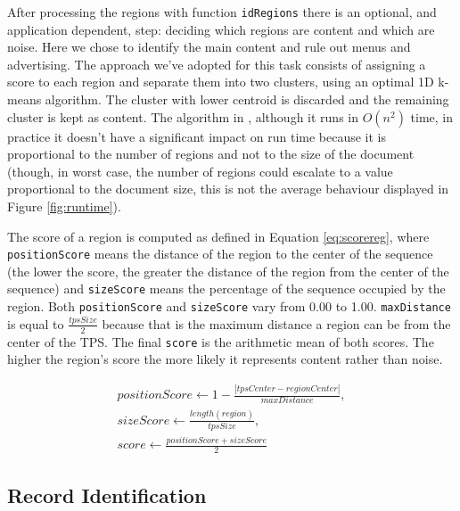 After processing the regions with function \texttt{idRegions} there is an
optional, and application dependent, step: deciding which regions are content
and which are noise. Here we chose to identify the main content and rule out
menus and advertising. The approach we've adopted for this task consists of
assigning a score to each region and separate them into two clusters, using an
optimal 1D k-means algorithm\cite{1dkmeans2011}. The cluster with lower centroid
is discarded and the remaining cluster is kept as content. The algorithm in
\cite{1dkmeans2011}, although it runs in $O(n^2)$ time, in practice it doesn't
have a significant impact on run time because it is proportional to the number
of regions and not to the size of the document (though, in worst case, the
number of regions could escalate to a value proportional to the document size,
this is not the average behaviour displayed in Figure \ref{fig:runtime}).

The score of a region is computed as defined in Equation \ref{eq:scorereg},
where \texttt{positionScore} means the distance of the region to the center of
the sequence (the lower the score, the greater the distance of the region from
the center of the sequence) and \texttt{sizeScore} means the percentage of the
sequence occupied by the region. Both \texttt{positionScore} and
\texttt{sizeScore} vary from 0.00 to 1.00. \texttt{maxDistance} is equal to
$\frac{tpsSize}{2}$ because that is the maximum distance a region can be from
the center of the TPS. The final \texttt{score} is the arithmetic mean of both
scores. The higher the region's score the more likely it represents content
rather than noise.

\vspace{-0.2cm}

\begin{small}
\begin{equation}\label{eq:scorereg}
\begin{split}
positionScore \leftarrow 1-\frac{|tpsCenter - regionCenter|}{maxDistance}, \\
sizeScore \leftarrow \frac{length(region)}{tpsSize},\\
score \leftarrow \frac{positionScore+sizeScore}{2}
\end{split}
\end{equation}
\end{small}

\vspace{-0.2cm}

\subsection{Record Identification}\label{ss:reci}

